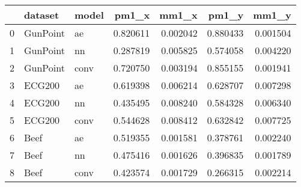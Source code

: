\begin{tabular}{lllrrrr}
\toprule
{} &   dataset & model &     pm1\_x &     mm1\_x &     pm1\_y &     mm1\_y \\
\midrule
0 &  GunPoint &    ae &  0.820611 &  0.002042 &  0.880433 &  0.001504 \\
1 &  GunPoint &    nn &  0.287819 &  0.005825 &  0.574058 &  0.004220 \\
2 &  GunPoint &  conv &  0.720750 &  0.003194 &  0.855155 &  0.001941 \\
3 &    ECG200 &    ae &  0.619398 &  0.006214 &  0.628707 &  0.007298 \\
4 &    ECG200 &    nn &  0.435495 &  0.008240 &  0.584328 &  0.006340 \\
5 &    ECG200 &  conv &  0.544628 &  0.008412 &  0.632842 &  0.007725 \\
6 &      Beef &    ae &  0.519355 &  0.001581 &  0.378761 &  0.002240 \\
7 &      Beef &    nn &  0.475416 &  0.001626 &  0.396835 &  0.001789 \\
8 &      Beef &  conv &  0.423574 &  0.001729 &  0.266315 &  0.002214 \\
\bottomrule
\end{tabular}
